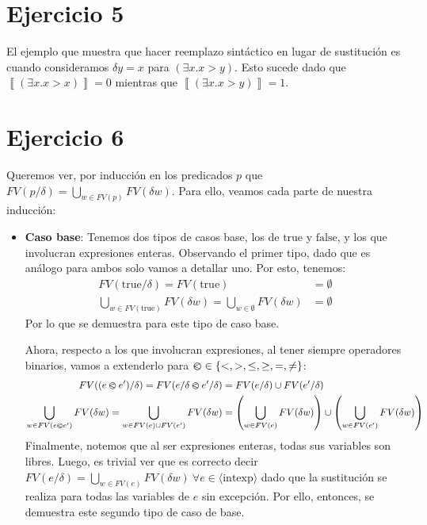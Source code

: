 \documentclass{article}
\newcommand{\aexp}[1]{\langle\text{#1}\rangle}
\newcommand{\intexp}{\aexp{intexp}}
\newcommand{\sem}[1]{\left\llbracket #1\right\rrbracket}
\begin{document}
\section*{Ejercicio 5}
El ejemplo que muestra que hacer reemplazo sintáctico en lugar de sustitución es cuando consideramos $\delta y = x$ para $(\exists x. x > y)$.
Esto sucede dado que $\sem{(\exists x. x > x)} = 0$ mientras que $\sem{(\exists x. x > y)} = 1$.

\section*{Ejercicio 6}
Queremos ver, por inducción en los predicados $p$ que $FV(p/\delta) = \bigcup_{w \in FV(p)} FV(\delta w)$.
Para ello, veamos cada parte de nuestra inducción:
\begin{itemize}
	\item \textbf{Caso base}: Tenemos dos tipos de casos base, los de $\text{true}$ y $\text{false}$, y los que involucran expresiones enteras.
	      Observando el primer tipo, dado que es análogo para ambos solo vamos a detallar uno.
	      Por esto, tenemos:
	      \begin{equation*}
		      \begin{aligned}
			      FV(\text{true}/\delta) = FV(\text{true})                                              & = \emptyset \\
			      \bigcup_{w \in FV(\text{true})} FV(\delta w) = \bigcup_{w \in \emptyset} FV(\delta w) & = \emptyset
		      \end{aligned}
	      \end{equation*}
	      Por lo que se demuestra para este tipo de caso base.

	      Ahora, respecto a los que involucran expresiones, al tener siempre operadores binarios, vamos a extenderlo para $\varolessthan \in \{<, >, \leq, \geq, =, \neq\}$:
	      \begin{equation*}
		      \begin{aligned}
			      FV((e \varolessthan e')/\delta) = FV(e/\delta \varolessthan e'/\delta)                               & = FV(e/\delta) \cup FV(e'/\delta)                                                                       \\
			      \bigcup_{w \in FV(e \varolessthan e')} FV(\delta w) = \bigcup_{w \in FV(e) \cup FV(e')} FV(\delta w) & = \left(\bigcup_{w \in FV(e)} FV(\delta w)\right) \cup \left(\bigcup_{w \in FV(e')} FV(\delta w)\right)
		      \end{aligned}
	      \end{equation*}
	      Finalmente, notemos que al ser expresiones enteras, todas sus variables son libres.
	      Luego, es trivial ver que es correcto decir $FV(e/\delta) = \bigcup_{w \in FV(e)} FV(\delta w)\ \forall e \in \intexp$ dado que la sustitución se realiza para todas las variables de $e$ sin excepción.
	      Por ello, entonces, se demuestra este segundo tipo de caso de base.


\end{itemize}
\end{document}
